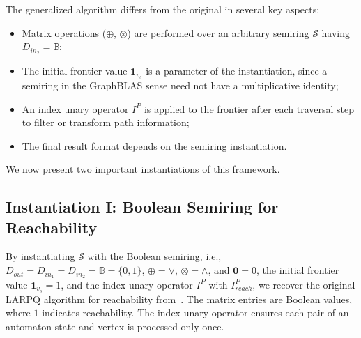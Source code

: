 The generalized algorithm differs from the original in several key aspects:
\begin{itemize}
	\item Matrix operations ($\oplus$, $\otimes$) are performed over an arbitrary semiring $\mathcal{S}$ having $D_{in_2} = \mathbb{B}$;
	\item The initial frontier value $\mathbf{1}_{v_s}$ is a parameter of the instantiation, since a semiring in the GraphBLAS sense need not have a multiplicative identity;
	\item An index unary operator $I^P$ is applied to the frontier after each traversal step to filter or transform path information;
	\item The final result format depends on the semiring instantiation.
\end{itemize}

We now present two important instantiations of this framework.

\subsection{Instantiation I: Boolean Semiring for Reachability}

By instantiating $\mathcal{S}$ with the Boolean semiring, i.e., $D_{out} = D_{in_1} = D_{in_2} = \mathbb{B} = \{0, 1\}$, $\oplus = \lor$, $\otimes = \land$, and $\mathbf{0} = 0$, the initial frontier value $\mathbf{1}_{v_s} = 1$, and the index unary operator $I^P$ with $I^P_{reach}$, we recover the original LARPQ algorithm for reachability from~\cite{belyanin2150single}. The matrix entries are Boolean values, where $1$ indicates reachability. The index unary operator ensures each pair of an automaton state and vertex is processed only once.

